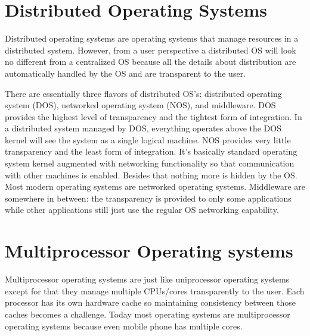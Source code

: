 \documentclass[twoside]{article}
\begin{document}
\section{Distributed Operating Systems}

Distributed operating systems are operating systems that manage resources in a distributed system. However, from a user perspective a distributed OS will look no different from a centralized OS because all the details about distribution are automatically handled by the OS and are transparent to the user.

There are essentially three flavors of distributed OS's: distributed operating system (DOS), networked operating system (NOS), and middleware. DOS provides the highest level of transparency and the tightest form of integration. In a distributed system managed by DOS, everything operates above the DOS kernel will see the system as a single logical machine. NOS provides very little transparency and the least form of integration. It's basically standard operating system kernel augmented with networking functionality so that communication with other machines is enabled. Besides that nothing more is hidden by the OS. Most modern operating systems are networked operating systems. Middleware are somewhere in between: the transparency is provided to only some applications while other applications still just use the regular OS networking capability.

\section{Multiprocessor Operating systems}

Multiprocessor operating systems are just like uniprocessor operating systems except for that they manage multiple CPUs/cores transparently to the user. Each processor has its own hardware cache so maintaining consistency between those caches becomes a challenge. Today most operating systems are multiprocessor operating systems because even mobile phone has multiple cores.
\end{document}
